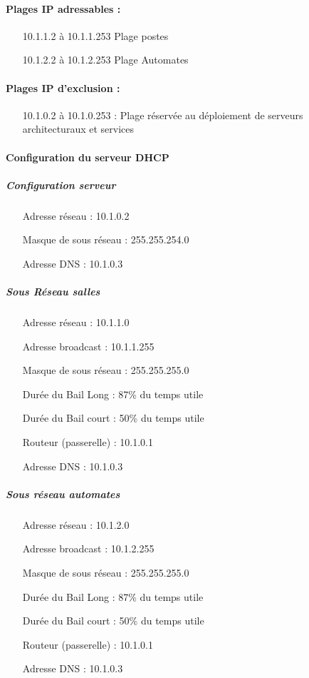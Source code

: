 \documentclass[a4paper]{article}
\begin{document}
\paragraph{Plages IP adressables :} 
\begin{itemize}
\item[10.1.1.2 à 10.1.1.253] Plage postes
\item[10.1.2.2 à 10.1.2.253] Plage Automates
\end{itemize}


\paragraph{Plages IP d'exclusion :}
\begin{itemize}
\item[10.1.0.2 à 10.1.0.253] : Plage réservée au déploiement de serveurs architecturaux et services
\end{itemize}

\paragraph{Configuration du serveur DHCP}

\subparagraph{Configuration serveur}
\begin{itemize}
\item[Adresse réseau]: 10.1.0.2
\item[Masque de sous réseau]: 255.255.254.0
\item[Adresse DNS]: 10.1.0.3
\end{itemize}

\subparagraph{Sous Réseau salles}
\begin{itemize}
\item[Adresse réseau]: 10.1.1.0
\item[Adresse broadcast]: 10.1.1.255
\item[Masque de sous réseau]: 255.255.255.0
\item[Durée du Bail Long]: 87\% du temps utile
\item[Durée du Bail court]: 50\% du temps utile
\item[Routeur (passerelle)]: 10.1.0.1
\item[Adresse DNS]: 10.1.0.3
\end{itemize}

\subparagraph{Sous réseau automates}
\begin{itemize}
\item[Adresse réseau]: 10.1.2.0
\item[Adresse broadcast]: 10.1.2.255
\item[Masque de sous réseau]: 255.255.255.0
\item[Durée du Bail Long]: 87\% du temps utile
\item[Durée du Bail court]: 50\% du temps utile
\item[Routeur (passerelle)]: 10.1.0.1
\item[Adresse DNS]: 10.1.0.3
\end{itemize}
\end{document}

